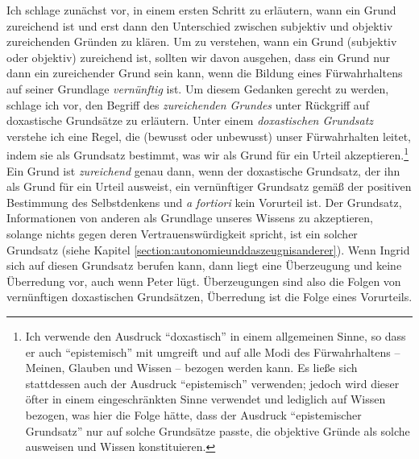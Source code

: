 Ich schlage zunächst vor, in einem ersten Schritt zu erläutern, wann ein Grund
zureichend ist und erst dann den Unterschied zwischen subjektiv und objektiv
zureichenden Gründen zu klären. Um zu verstehen, wann ein Grund (subjektiv oder
objektiv) zureichend ist, sollten wir davon ausgehen, dass ein Grund nur dann
ein zureichender Grund sein kann, wenn die Bildung eines Fürwahrhaltens auf
seiner Grundlage \emph{vernünftig} ist. Um diesem Gedanken gerecht zu werden,
schlage ich vor, den Begriff des \emph{zureichenden Grundes} unter Rückgriff auf
doxastische Grundsätze zu erläutern. Unter einem \emph{doxastischen Grundsatz}
verstehe ich eine Regel, die (bewusst oder unbewusst) unser Fürwahrhalten
leitet, indem sie als Grundsatz bestimmt, was wir als Grund für ein Urteil
akzeptieren.\footnote{Ich verwende den Ausdruck \enquote{doxastisch} in einem
allgemeinen Sinne, so dass er auch \enquote{epistemisch} mit umgreift und auf
alle Modi des Fürwahrhaltens -- Meinen, Glauben und Wissen -- bezogen werden
kann. Es ließe sich stattdessen auch der Ausdruck \enquote{epistemisch}
verwenden; jedoch wird dieser öfter in einem eingeschränkten Sinne verwendet
und lediglich auf Wissen bezogen, was hier die Folge hätte, dass der Ausdruck
\enquote{epistemischer Grundsatz} nur auf solche Grundsätze passte, die
objektive Gründe als solche ausweisen und Wissen konstituieren.}  Ein
Grund ist \emph{zureichend} genau dann, wenn der doxastische Grundsatz, der ihn als
Grund für ein Urteil ausweist, ein vernünftiger Grundsatz gemäß der positiven Bestimmung
des Selbstdenkens und \emph{a fortiori} kein Vorurteil ist. Der Grundsatz,
Informationen von anderen als Grundlage unseres Wissens zu akzeptieren, solange
nichts gegen deren Vertrauenswürdigkeit spricht, ist ein solcher Grundsatz
(siehe Kapitel \ref{section:autonomieunddaszeugnisanderer}).
Wenn Ingrid sich auf diesen Grundsatz berufen kann, dann liegt eine Überzeugung
und keine Überredung vor, auch wenn Peter lügt. Überzeugungen sind also die Folgen
von vernünftigen doxastischen Grundsätzen, Überredung ist die Folge eines
Vorurteils.

